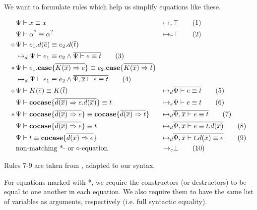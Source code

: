 \documentclass[twoside,12pt,a4paper]{article}
\begin{document}
We want to formulate rules which help us simplify equations like these.
\begin{definition}
    \begin{align*}
    &\Psi \vdash x\equiv x&\mapsto_r&\top
    \tag{1}\\
    &\Psi \vdash \alpha^? \equiv \alpha^?&\mapsto_r& \top
    \tag{2}\\
    \circ\,&\Psi \vdash e_1.d({\overline{e}})\equiv e_2.d({\overline{t}})
    \\ &\mapsto_d \Psi\vdash e_1 \equiv e_2 \wedge \overline{\Psi\vdash e\equiv t}
    \tag{3}\\
    *\,&\Psi \vdash e_1.\textbf{case}\{\overline{K(\overline{x})\Rightarrow e}\}\equiv e_2.\textbf{case}\{\overline{K(\overline{x})\Rightarrow t}\}
    \\ &\mapsto_d \Psi \vdash e_1 \equiv e_2\wedge \overline{\Psi, \overline{x}\vdash e\equiv t}
    \tag{4}\\
    \circ\,&\Psi\vdash K(\overline{e})\equiv K(\overline{t})&
    \mapsto_d&\overline{\Psi\vdash e\equiv t}
    \tag{5}\\
    & \Psi \vdash \textbf{cocase}\{\overline{d(\overline{x})\Rightarrow e.d(\overline{x})}\}\equiv t
    &\mapsto_e&\Psi\vdash e\equiv t
    \tag{6}\\
    *\, &\Psi\vdash \textbf{cocase}\{\overline{d(\overline{x})\Rightarrow e}\}\equiv 
    \textbf{cocase}\{\overline{d(\overline{x})\Rightarrow t}\}
    &\mapsto_d& \overline{\Psi, \overline{x}\vdash e \equiv t}
    \tag{7}\\
    &\Psi\vdash \textbf{cocase}\{\overline{d(\overline{x})\Rightarrow e}\}\equiv t 
    &\mapsto_d& \overline{\Psi,\overline{x} \vdash e \equiv t.d(\overline{x})}
    \tag{8}\\
    &\Psi\vdash t\equiv \textbf{cocase}\{\overline{d(\overline{x})\Rightarrow e}\} 
    &\mapsto_d& \overline{\Psi, \overline{x}\vdash t.d(\overline{x}) \equiv e}
    \tag{9}\\    
    &\text{non-matching *- or $\circ$-equation}&\mapsto_c&\bot
    \tag{10}
    \end{align*}
\end{definition}
Rules 7-9 are taken from \cite{10.5555/2021953.2021960}, adapted to our syntax. 

For equations marked with *, we require the constructors (or destructors) to be equal to one another in each equation. 
We also require them to have the same list of variables as arguments, respectively (i.e. full syntactic equality).
\end{document}
